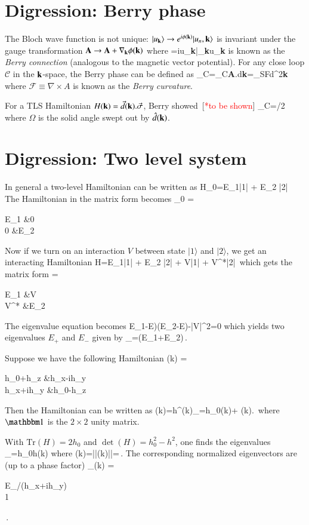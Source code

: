 \documentclass[aps,prb,epsf,epsfig,floatfix,showpacs,groupedaddres,superscriptaddress]{revtex4-1}
\numberwithin{equation}{section}
\def\blgn#1\elgn{\begin{align}#1\end{align}}
\newcommand{\f}{\frac}
\def\h{\hat}
\def\g{\gamma}
\def\sig{\sigma}
\def\Om{\Omega}
\newcommand{\kv}{{\bf k}}
\newcommand{\Av}{{\bf A}}
\newcommand{\grad}{\nabla}
\newcommand{\curl}{{\nabla\times}}
\newcommand{\bbone}{\mathbbm 1}
\newcommand{\Tr}{\text{Tr}} %
\def\tbs{[\textcolor{red}{*to be shown}]}
\newcommand{\mc}{\mathcal}
\newcommand{\mcC}{{\mc C}}
\newcommand{\mcF}{{\mc F}}
\newcommand{\mcS}{{\mc S}}
\newcommand{\bbmat}{\begin{bmatrix}}
\newcommand{\ebmat}{\end{bmatrix}}
\newcommand{\lngl}{\langle}
\newcommand{\rngl}{\rangle}
\newcommand{\nk}{n,{\bf k}}
\begin{document}
\section{Digression: Berry phase}
The Bloch wave function is not unique: $|u_\kv\rngl\to e^{i\phi(\kv)}|u_\nk\rngl$ is invariant under the gauge transformation $\Av \to \Av +\grad_\kv \phi(\kv)$ where
\blgn
\Av=i\lngl u_\kv|\grad_\kv u_\kv\rngl
\elgn
is known as the \emph{Berry connection} (analogous to the magnetic vector potential). 
For any close loop $\mcC$ in the $\kv$-space, the Berry phase can be defined as
\blgn
\gamma_C=\oint_\mcC \Av.d\kv =\int_\mcS \mcF d^2\kv\,
\elgn 
where $\mcF\equiv \curl A$ is known as the \emph{Berry curvature}.

For a TLS Hamiltonian $H(\kv)=\vec{d}(\kv).\vec{\sig}$, Berry showed~\cite{berry:prs84}\tbs
\blgn
\g_\mcC=\Om/2
\elgn
where $\Om$ is the solid angle swept out by $\h d(\kv)$.

\def\Qe{Q_\text{end}}


\section{Digression: Two level system}
In general a two-level Hamiltonian can be written as
\blgn
\h H_0=E_1|1\rngl\lngl 1| + E_2 |2\rngl\lngl 2|\,
\elgn
The Hamiltonian in the matrix form becomes
\blgn
H_0 =
\bbmat
E_1 &0\\
0   &E_2
\ebmat
\elgn

Now if we turn on an interaction $V$ between state $|1\rngl$ and $|2\rngl$,
we get an interacting Hamiltonian
\blgn
\h H=E_1|1\rngl\lngl 1| + E_2 |2\rngl\lngl 2| + V|1\rngl\lngl 2| + V^*|2\rngl\lngl 1|\,
\elgn
which gets the matrix form
\blgn
{\bf H}=
\bbmat
E_1 &V\\
V^*   &E_2
\ebmat
\elgn

The eigenvalue equation becomes
\blgn
(E_1-E)(E_2-E)-|V|^2=0
\elgn
which yields two eigenvalues $E_+$ and $E_-$ given by
\blgn
E_\pm=(E_1+E_2)\pm{}\,.
\elgn

Suppose we have the following Hamiltonian
\blgn
{\bf H}(k)
=
\bbmat
h_0+h_z  &h_x-ih_y\\
h_x+ih_y &h_0-h_z
\ebmat
\elgn

Then the Hamiltonian can be written as
\blgn
H(k)=h^\mu(k)\sig_\mu=h_0(k)\bbone + (k).\vec{\sig}\,
\elgn
where $\bbone$ is the $2\times2$ unity matrix.

With $\Tr(H)=2h_0$ and $\det (H)=h_0^2-h^2$, one finds the eigenvalues
\blgn
E_\pm=h_0\pm h(k)
\label{eq:dispersion:tls}
\elgn
where 
\blgn
h(k)=||(k)||=\,.
\elgn
The corresponding normalized eigenvectors are (up to a phase factor)
\blgn
u_\pm(k)
=\f{1}{\sqrt{1+(h_z+E_\pm^2)/(h_x^2+h_y^2)}}
\bbmat
E_\pm/(h_x+ih_y)\\
1
\ebmat\,.
\elgn
\end{document}

